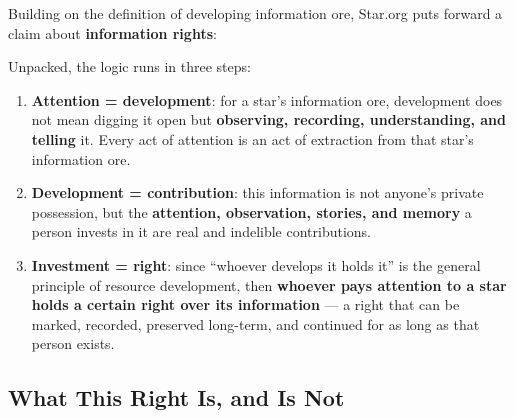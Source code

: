 \documentclass[11pt,fontset=none]{ctexart}
\begin{document}
Building on the definition of developing information ore, Star.org puts forward a claim about \textbf{information rights}:


Unpacked, the logic runs in three steps:

\begin{enumerate}
  \item \textbf{Attention = development}: for a star's information ore, development does not mean digging it open but \textbf{observing, recording, understanding, and telling} it. Every act of attention is an act of extraction from that star's information ore.
  \item \textbf{Development = contribution}: this information is not anyone's private possession, but the \textbf{attention, observation, stories, and memory} a person invests in it are real and indelible contributions.
  \item \textbf{Investment = right}: since ``whoever develops it holds it'' is the general principle of resource development, then \textbf{whoever pays attention to a star holds a certain right over its information} — a right that can be marked, recorded, preserved long-term, and continued for as long as that person exists.
\end{enumerate}

\subsection{What This Right Is, and Is Not}

\end{document}
